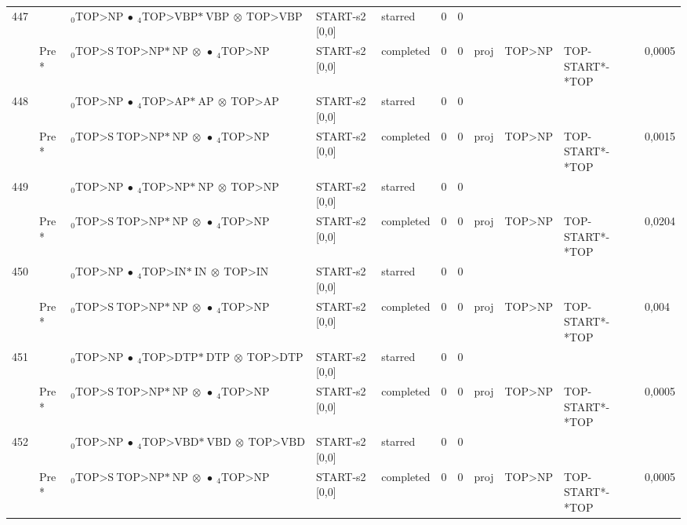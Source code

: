\documentclass[10pt]{article}
\begin{document}
\begin{longtable}[htbp]{lllllllllll}
447 & & $ {}_0 \textrm{TOP>NP} \  \bullet \ {}_{4} \textrm{TOP>VBP*} \ \textrm{VBP} \  \otimes \ \textrm{TOP>VBP} $ & START-s2 [0,0] & starred & 0 & 0 & & & & \\ 
 & Pre *& $ {}_0 \textrm{TOP>S} \ \textrm{TOP>NP*} \ \textrm{NP} \  \otimes \  \bullet \ {}_{4} \textrm{TOP>NP} $ & START-s2 [0,0] & completed & 0 & 0 & proj & TOP>NP & TOP-START*-*TOP & 0,0005 \\ 
448 & & $ {}_0 \textrm{TOP>NP} \  \bullet \ {}_{4} \textrm{TOP>AP*} \ \textrm{AP} \  \otimes \ \textrm{TOP>AP} $ & START-s2 [0,0] & starred & 0 & 0 & & & & \\ 
 & Pre *& $ {}_0 \textrm{TOP>S} \ \textrm{TOP>NP*} \ \textrm{NP} \  \otimes \  \bullet \ {}_{4} \textrm{TOP>NP} $ & START-s2 [0,0] & completed & 0 & 0 & proj & TOP>NP & TOP-START*-*TOP & 0,0015 \\ 
449 & & $ {}_0 \textrm{TOP>NP} \  \bullet \ {}_{4} \textrm{TOP>NP*} \ \textrm{NP} \  \otimes \ \textrm{TOP>NP} $ & START-s2 [0,0] & starred & 0 & 0 & & & & \\ 
 & Pre *& $ {}_0 \textrm{TOP>S} \ \textrm{TOP>NP*} \ \textrm{NP} \  \otimes \  \bullet \ {}_{4} \textrm{TOP>NP} $ & START-s2 [0,0] & completed & 0 & 0 & proj & TOP>NP & TOP-START*-*TOP & 0,0204 \\ 
450 & & $ {}_0 \textrm{TOP>NP} \  \bullet \ {}_{4} \textrm{TOP>IN*} \ \textrm{IN} \  \otimes \ \textrm{TOP>IN} $ & START-s2 [0,0] & starred & 0 & 0 & & & & \\ 
 & Pre *& $ {}_0 \textrm{TOP>S} \ \textrm{TOP>NP*} \ \textrm{NP} \  \otimes \  \bullet \ {}_{4} \textrm{TOP>NP} $ & START-s2 [0,0] & completed & 0 & 0 & proj & TOP>NP & TOP-START*-*TOP & 0,004 \\ 
451 & & $ {}_0 \textrm{TOP>NP} \  \bullet \ {}_{4} \textrm{TOP>DTP*} \ \textrm{DTP} \  \otimes \ \textrm{TOP>DTP} $ & START-s2 [0,0] & starred & 0 & 0 & & & & \\ 
 & Pre *& $ {}_0 \textrm{TOP>S} \ \textrm{TOP>NP*} \ \textrm{NP} \  \otimes \  \bullet \ {}_{4} \textrm{TOP>NP} $ & START-s2 [0,0] & completed & 0 & 0 & proj & TOP>NP & TOP-START*-*TOP & 0,0005 \\ 
452 & & $ {}_0 \textrm{TOP>NP} \  \bullet \ {}_{4} \textrm{TOP>VBD*} \ \textrm{VBD} \  \otimes \ \textrm{TOP>VBD} $ & START-s2 [0,0] & starred & 0 & 0 & & & & \\ 
 & Pre *& $ {}_0 \textrm{TOP>S} \ \textrm{TOP>NP*} \ \textrm{NP} \  \otimes \  \bullet \ {}_{4} \textrm{TOP>NP} $ & START-s2 [0,0] & completed & 0 & 0 & proj & TOP>NP & TOP-START*-*TOP & 0,0005 \\ 

\end{longtable}
\end{document}
